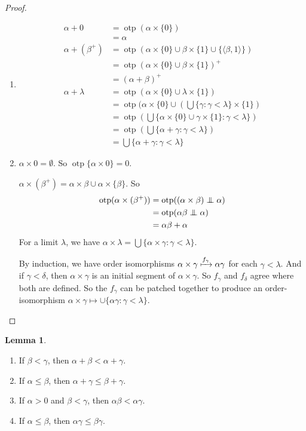 \documentclass[a4paper]{article}
\theoremstyle{definition}
\newtheorem*{lemma}{Lemma}
\newcommand{\bra}{\langle}
\newcommand{\ket}{\rangle}
\newcommand{\oadd}{\mathrel\bot\joinrel\mspace{-8mu}\mathrel\bot}
\DeclareMathOperator\otp{otp}
\begin{document}
\begin{proof}\leavevmode
  \begin{enumerate}
  \item 
    \begin{align*}
      \alpha + 0 &= \otp(\alpha\times \{0\})\\
      &= \alpha\\
      \alpha + (\beta^+) &= \otp(\alpha\times\{0\}\cup \beta\times \{1\} \cup \{\bra \beta, 1\ket\})\\
      &= \otp(\alpha\times \{0\}\cup \beta\times\{1\})^+\\
      &= (\alpha + \beta)^+\\
      \alpha + \lambda &= \otp(\alpha \times \{0\} \cup \lambda \times \{1\})\\
      &= \otp(\alpha\times\{0\}\cup(\bigcup \{\gamma: \gamma < \lambda\} \times \{1\})\\
      &= \otp(\bigcup\{\alpha\times\{0\}\cup \gamma\times\{1\}: \gamma < \lambda\})\\
      &= \otp(\bigcup \{\alpha + \gamma: \gamma < \lambda\})\\
      &= \bigcup \{\alpha + \gamma: \gamma < \lambda\}
    \end{align*}
  \item $\alpha\times 0 = \emptyset$. So $\otp\{\alpha\times 0\} = 0$.

    $\alpha\times(\beta^+) = \alpha\times\beta\cup \alpha\times\{\beta\}$. So
    \begin{align*}
      \otp(\alpha\times(\beta^+)) &= \otp ((\alpha\times\beta)\oadd\alpha)\\
      &= \otp(\alpha\beta\oadd\alpha)\\
      &= \alpha\beta + \alpha
    \end{align*}
    For a limit $\lambda$, we have $\alpha\times\lambda = \bigcup\{\alpha\times\gamma : \gamma < \lambda\}$.

    By induction, we have order isomorphisms $\alpha\times \gamma \xmapsto{f_\gamma} \alpha\gamma$ for each $\gamma < \lambda$. And if $\gamma < \delta$, then $\alpha \times\gamma$ is an initial segment of $\alpha\times\gamma$. So $f_\gamma$ and $f_\delta$ agree where both are defined. So the $f_\gamma$ can be patched together to produce an order-isomorphism $\alpha\times\gamma \mapsto \cup\{\alpha\gamma : \gamma < \lambda\}$.
  \end{enumerate}
\end{proof}

\begin{lemma}\leavevmode
  \begin{enumerate}
  \item If $\beta < \gamma$, then $\alpha + \beta < \alpha + \gamma$.
  \item If $\alpha \leq \beta$, then $\alpha + \gamma \leq \beta + \gamma$.
  \item If $\alpha > 0$ and $\beta < \gamma$, then $\alpha\beta < \alpha\gamma$.
  \item If $\alpha \leq \beta$, then $\alpha\gamma \leq \beta\gamma$.
  \end{enumerate}
\end{lemma}
\end{document}
